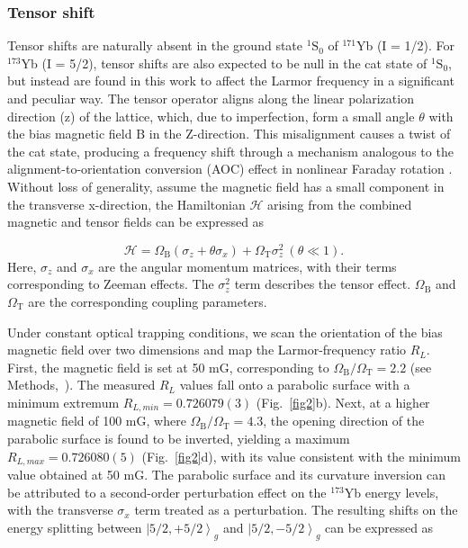 \documentclass[pdflatex,sn-nature,centre]{sn-jnl}%
\begin{document}
\subsubsection*{Tensor shift}\label{tensor}

Tensor shifts are naturally absent in the ground state $^{1}\mathrm{S}_0$ of $^{171}$Yb (I = 1/2). For $^{173}$Yb (I = 5/2), tensor shifts are also expected to be null in the cat state of $^{1}\mathrm S_0$, but instead are found in this work to affect the Larmor frequency in a significant and peculiar way. The tensor operator aligns along the linear polarization direction (z) of the lattice, which, due to imperfection, form a small angle $\theta$ with the bias magnetic field $\mathrm B$ in the Z-direction. This misalignment causes a twist of the cat state, producing a frequency shift through a mechanism analogous to the alignment-to-orientation conversion (AOC) effect in nonlinear Faraday rotation \cite{Budker2000AOC}. Without loss of generality, assume the magnetic field has a small component in the transverse x-direction, the Hamiltonian $\mathscr H$ arising from the combined magnetic and tensor fields can be expressed as

\begin{equation}\label{Ham}
    \mathscr H = \Omega_{\mathrm B}(\sigma_{z}+\theta\sigma_{x})+\Omega_{\mathrm T}\sigma_{z}^2\ (\theta\ll1).
\end{equation}
Here, $\sigma_{z}$ and $\sigma_{x}$ are the angular momentum matrices, with their terms corresponding to Zeeman effects. The $\sigma_{z}^2$ term describes the tensor effect. $\Omega_{\mathrm B}$ and $\Omega_{\mathrm T}$ are the corresponding coupling parameters.

Under constant optical trapping conditions, we scan the orientation of the bias magnetic field over two dimensions and map the Larmor-frequency ratio $R_L$. First, the magnetic field is set at 50 mG, corresponding to $\Omega_{\mathrm B}/\Omega_{\mathrm T}=2.2$ (see Methods,~). The measured $R_L$ values fall onto a parabolic surface with a minimum extremum $R_{L,min} = 0.726079(3)$ (Fig.~\ref{fig2}b). Next, at a higher magnetic field of 100 mG, where $\Omega_{\mathrm B}/\Omega_{\mathrm T}=4.3$, the opening direction of the parabolic surface is found to be inverted, yielding a maximum $R_{L,max} = 0.726080(5)$ (Fig.~\ref{fig2}d), with its value consistent with the minimum value obtained at 50 mG. The parabolic surface and its curvature inversion can be attributed to a second-order perturbation effect on the $^{173}$Yb energy levels, with the transverse $\sigma_{x}$ term treated as a perturbation. The resulting shifts on the energy splitting between $\left\vert5/2,+5/2\right\rangle_g$ and $\left\vert5/2,-5/2\right\rangle_g$ can be expressed as 
\end{document}
